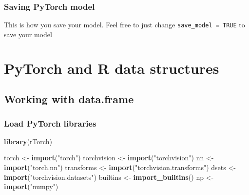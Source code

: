 \documentclass[]{book}
\newenvironment{Shaded}{\begin{snugshade}}{\end{snugshade}}
\newcommand{\CommentTok}[1]{\textcolor[rgb]{0.56,0.35,0.01}{\textit{#1}}}
\newcommand{\ControlFlowTok}[1]{\textcolor[rgb]{0.13,0.29,0.53}{\textbf{#1}}}
\newcommand{\KeywordTok}[1]{\textcolor[rgb]{0.13,0.29,0.53}{\textbf{#1}}}
\newcommand{\NormalTok}[1]{#1}
\newcommand{\OperatorTok}[1]{\textcolor[rgb]{0.81,0.36,0.00}{\textbf{#1}}}
\newcommand{\OtherTok}[1]{\textcolor[rgb]{0.56,0.35,0.01}{#1}}
\newcommand{\StringTok}[1]{\textcolor[rgb]{0.31,0.60,0.02}{#1}}
\begin{document}
\hypertarget{saving-pytorch-model}{%
\section{Saving PyTorch model}\label{saving-pytorch-model}}

This is how you save your model.
Feel free to just change \texttt{save\_model\ =\ TRUE} to save your model

\begin{Shaded}
\end{Shaded}

\hypertarget{part-pytorch-and-r-data-structures}{%
\part{PyTorch and R data structures}\label{part-pytorch-and-r-data-structures}}

\hypertarget{working-with-data.frame}{%
\chapter{Working with data.frame}\label{working-with-data.frame}}

\hypertarget{load-pytorch-libraries}{%
\section{Load PyTorch libraries}\label{load-pytorch-libraries}}

\begin{Shaded}
\begin{Highlighting}[]
\KeywordTok{library}\NormalTok{(rTorch)}

\NormalTok{torch       <-}\StringTok{ }\KeywordTok{import}\NormalTok{(}\StringTok{"torch"}\NormalTok{)}
\NormalTok{torchvision <-}\StringTok{ }\KeywordTok{import}\NormalTok{(}\StringTok{"torchvision"}\NormalTok{)}
\NormalTok{nn          <-}\StringTok{ }\KeywordTok{import}\NormalTok{(}\StringTok{"torch.nn"}\NormalTok{)}
\NormalTok{transforms  <-}\StringTok{ }\KeywordTok{import}\NormalTok{(}\StringTok{"torchvision.transforms"}\NormalTok{)}
\NormalTok{dsets       <-}\StringTok{ }\KeywordTok{import}\NormalTok{(}\StringTok{"torchvision.datasets"}\NormalTok{)}
\NormalTok{builtins    <-}\StringTok{ }\KeywordTok{import_builtins}\NormalTok{()}
\NormalTok{np          <-}\StringTok{ }\KeywordTok{import}\NormalTok{(}\StringTok{"numpy"}\NormalTok{)}
\end{Highlighting}
\end{Shaded}
\end{document}
